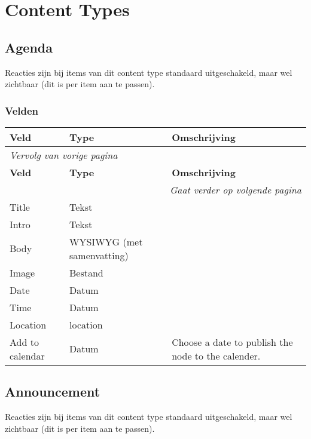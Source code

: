 \section{Content Types}

\subsection{Agenda}
\label{sec:content-agenda}
Reacties zijn bij items van dit content type standaard uitgeschakeld, maar wel zichtbaar (dit is per item aan te passen).

\subsubsection{Velden}
  \begin{longtable}{| p{3.75cm}|p{3.75cm}|p{7.50cm}|}
  \hline
  \rowcolor{tableheader}
  \textbf{Veld} & \textbf{Type} & \textbf{Omschrijving}  \tabularnewline
  \hline
\endfirsthead
\multicolumn{3}{l}{\textit{Vervolg van vorige pagina}} \\
\hline
\rowcolor{tableheader}
  \textbf{Veld} & \textbf{Type} & \textbf{Omschrijving}  \tabularnewline
  \hline
\hline
\endhead
\multicolumn{3}{r}{\textit{Gaat verder op volgende pagina}} \\
\endfoot
\hline
\endlastfoot
  \raggedright{Title} & \raggedright{Tekst} & \raggedright{}  \tabularnewline
  \hline
  \raggedright{Intro} & \raggedright{Tekst} & \raggedright{}  \tabularnewline
  \hline
  \raggedright{Body} & \raggedright{WYSIWYG (met samenvatting)} & \raggedright{}  \tabularnewline
  \hline
  \raggedright{Image} & \raggedright{Bestand} & \raggedright{}  \tabularnewline
  \hline
  \raggedright{Date} & \raggedright{Datum} & \raggedright{}  \tabularnewline
  \hline
  \raggedright{Time} & \raggedright{Datum} & \raggedright{}  \tabularnewline
  \hline
  \raggedright{Location} & \raggedright{location} & \raggedright{}  \tabularnewline
  \hline
  \raggedright{Add to calendar} & \raggedright{Datum} & \raggedright{Choose a date to publish the node to the calender.}  \tabularnewline
  \hline
  \end{longtable}

\subsection{Announcement}
\label{sec:content-announcement}
Reacties zijn bij items van dit content type standaard uitgeschakeld, maar wel zichtbaar (dit is per item aan te passen).

